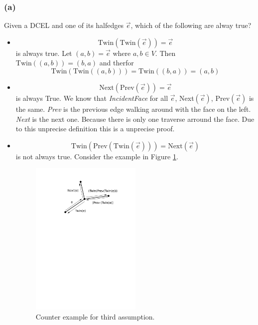 \documentclass[11pt,a4paper,ngerman]{article}
\begin{document}
\subsubsection*{(a)}
Given a DCEL and one of its halfedges $\overrightarrow{e}$, which of the following are alway true?
\begin{itemize}
    \item 
        \begin{equation*}
            \text{Twin}(\text{Twin}(\overrightarrow{e})) = \overrightarrow{e}
        \end{equation*}
        is always true. Let $(a,b) = \overrightarrow{e}$ where $a,b \in V$.
        Then $\text{Twin}((a,b)) = (b,a)$ and therfor 
        \begin{equation*}
            \text{Twin}(\text{Twin}((a,b))) = \text{Twin}((b,a)) = (a,b)
        \end{equation*}
    \item
        \begin{equation*}
            \text{Next}(\text{Prev}(\overrightarrow{e})) = \overrightarrow{e}
        \end{equation*}
        is always True. We know that \emph{IncidentFace} for all $\overrightarrow{e}$, Next$(\overrightarrow{e})$,
        Prev$(\overrightarrow{e})$ is the same. \emph{Prev} is the previous edge walking around with the face on the left.
        \emph{Next} is the next one. Because there is only one traverse arround the face. Due to this unprecise definition
        this is a unprecise proof.
    \item
        \begin{equation*}
            \text{Twin}(\text{Prev}(\text{Twin}(\overrightarrow{e}))) = \text{Next}(\overrightarrow{e})
        \end{equation*}
        is not always true.
        Consider the example in Figure \ref{alge:ueb4:counter1.3}.
        \begin{figure}[bth]
            \centering
            \includegraphics[width=0.5\textwidth, clip, trim = 5cm 20cm 4cm 2cm]{media/counter13}
            \caption{Counter example for third assumption.}
            \label{alge:ueb4:counter1.3}
        \end{figure}


\end{itemize}
\end{document}
